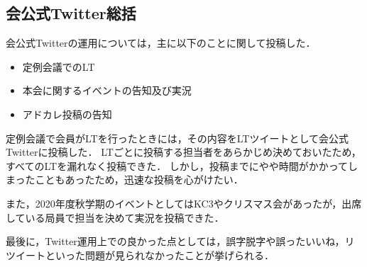 \subsection*{会公式Twitter総括}



会公式Twitterの運用については，主に以下のことに関して投稿した．

\begin{itemize}
\item 定例会議でのLT
\item 本会に関するイベントの告知及び実況
\item アドカレ投稿の告知
\end{itemize}


定例会議で会員がLTを行ったときには，その内容をLTツイートとして会公式Twitterに投稿した．
LTごとに投稿する担当者をあらかじめ決めておいたため，すべてのLTを漏れなく投稿できた．
しかし，投稿までにやや時間がかかってしまったこともあったため，迅速な投稿を心がけたい．

また，2020年度秋学期のイベントとしてはKC3やクリスマス会があったが，出席している局員で担当を決めて実況を投稿できた．

最後に，Twitter運用上での良かった点としては，誤字脱字や誤ったいいね，リツイートといった問題が見られなかったことが挙げられる．

